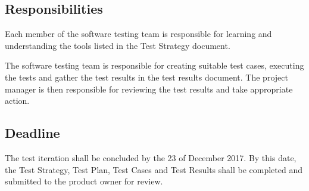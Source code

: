 \documentclass[a4paper, 12pt]{article}
\begin{document}
\subsection{Responsibilities}
Each member of the software testing team is responsible for learning and understanding the tools listed in the Test Strategy document. 

The software testing team is responsible for creating suitable test cases, executing the tests and gather the test results in the test results document. The project manager is then responsible for reviewing the test results and take appropriate action.

\subsection{Deadline}
The test iteration shall be concluded by the 23 of December 2017. By this date, the Test Strategy, Test Plan, Test Cases and Test Results shall be completed and submitted to the product owner for review. 
\end{document}

